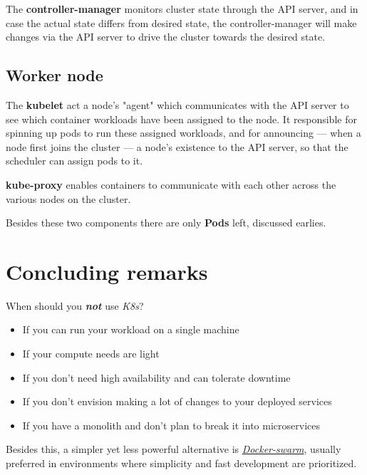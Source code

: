 The \textbf{controller-manager} monitors cluster state through the API server, 
and in case the actual state differs from desired state,
the controller-manager will make changes via the API server to drive the cluster towards the desired state.

\subsection{Worker node}

The \textbf{kubelet} act a node's "agent" which communicates with
the API server to see which container workloads have been assigned to the node.
It responsible for spinning up pods to run these
assigned workloads, and for announcing {---} when a node first joins the cluster {---} a node's existence to the API server,
so that the scheduler can assign pods to it.

\textbf{kube-proxy} enables containers to communicate with each other across the various nodes on the cluster.

Besides these two components there are only \textbf{Pods} left, discussed earlies.

\section{Concluding remarks}
When should you \textbf{\textit{not}} use \textit{K8s}?
\begin{itemize}
   \item If you can run your workload on a single machine
   \item If your compute needs are light
   \item If you don't need high availability and can tolerate downtime
   \item If you don't envision making a lot of changes to your deployed services
   \item If you have a monolith and don't plan to break it into microservices
\end{itemize}

Besides this,
a simpler yet less powerful alternative is \href{https://docs.docker.com/engine/swarm/}{\textit{Docker-swarm}},
usually preferred in environments where simplicity and fast development are prioritized.